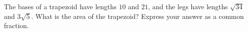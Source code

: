 The bases of a trapezoid have lengths $10$ and $21$, and the legs have lengths $\sqrt{34}$ and $3\sqrt5$. What is the area of the trapezoid? Express your answer as a common fraction.
